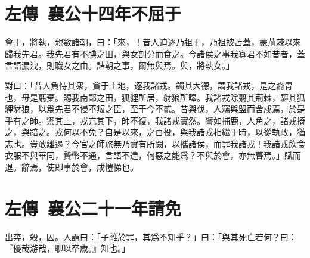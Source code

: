 \theendnotes

\section[駒支不屈于晉\quad{\small 左傳 襄公十四年}]{{\normalsize 左傳\ 襄公十四年}\quad {}不屈于}
會于，將執，親數諸朝，曰：「來，！昔人迫逐乃祖于，乃祖被苫蓋，蒙荊棘以來歸我先君。我先君有不腆之田，與女剖分而食之。今諸侯之事我寡君不如昔者，蓋言語漏洩，則職女之由。詰朝之事，爾無與焉。與，將執女。」

對曰：「昔人負恃其衆，貪于土地，逐我諸戎。蠲其大德，謂我諸戎，是之裔冑也，毋是翦棄。賜我南鄙之田，狐貍所居，豺狼所嗥。我諸戎除翦其荊棘，驅其狐貍豺狼，以爲先君不侵不叛之臣，至于今不貳。昔與伐，人竊與盟而舍戍焉，於是乎有之師。禦其上，戎亢其下，師不復，我諸戎實然。譬如捕鹿，人角之，諸戎掎之，與踣之。戎何以不免？自是以來，之百役，與我諸戎相繼于時，以從執政，猶志也。豈敢離逷？今官之師旅無乃實有所闕，以攜諸侯，而罪我諸戎！我諸戎飲食衣服不與華同，贄幣不通，言語不達，何惡之能爲？不與於會，亦無瞢焉。」賦而退。辭焉，使即事於會，成愷悌也。

\theendnotes

\section[祁奚請免叔向\quad{\small 左傳\ 襄公二十一年}]{{\normalsize 左傳\ 襄公二十一年}\quad {}請免}
出奔，殺，囚。人謂曰：「子離於罪，其爲不知乎？」曰：「與其死亡若何？曰：『優哉游哉，聊以卒歲。』知也。」

